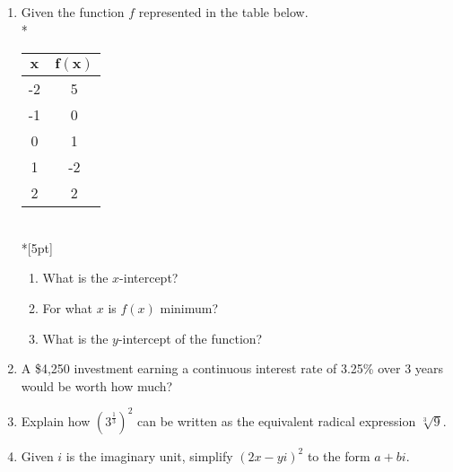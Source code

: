 \documentclass[12pt, oneside]{article}
\begin{document}
\begin{enumerate}
\item Given the function $f$ represented in the table below.\\*
\begin{center}
\begin{tabular}{|c|c|}
    \hline 
    $\boldsymbol{x}$ & $\boldsymbol{f(x)}$\\ 
    \hline 
    -2 & 5 \\ 
    \hline 
    -1 & 0 \\ 
    \hline 
    0 & 1 \\ 
    \hline 
    1 & -2 \\ 
    \hline 
    2 & 2 \\ 
    \hline 
\end{tabular}\\*[5pt]
\end{center}
\begin{enumerate}
    \item What is the $x$-intercept?\\[25pt]
    \item For what $x$ is $f(x)$ minimum?\\[25pt]
    \item What is the $y$-intercept of the function?\\[15pt]
\end{enumerate}

\newpage

\item A \$4,250 investment earning a continuous interest rate of 3.25\% over 3 years would be worth how much?\\[2in]


\item Explain how $\displaystyle \left(3^{\frac{1}{3}} \right)^2$ can be written as the equivalent radical expression $\sqrt[3]9$. \\[3in] %

\item Given $i$ is the imaginary unit, simplify $(2x-yi)^2$ to the form $a+bi$. \\[1.8in]%

\newpage


\end{enumerate}
\end{document}

